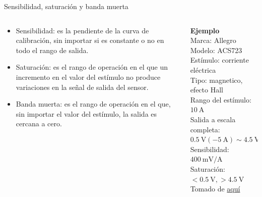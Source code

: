 \documentclass[aspectratio=169]{beamer}
\begin{document}
\begin{frame}{Sensibilidad, saturación y banda muerta}
    \begin{columns}[c, onlytextwidth]
        \begin{column}{0.60\textwidth}
            \begin{itemize}
                \item Sensibilidad: es la pendiente de la curva de calibración, sin importar si es constante o no en todo el rango de salida.  
                \item Saturación: es el rango de operación en el que un incremento en el valor del estímulo no produce variaciones en la señal de salida del sensor. 
                \item Banda muerta: es el rango de operación en el que, sin importar el valor del estímulo, la salida es cercana a cero.
            \end{itemize}
        \end{column}
        \begin{column}{0.35\textwidth}
            \textbf{Ejemplo}\\[4pt]
            Marca: Allegro\\[4pt]
            Modelo: ACS723\\[4pt]
            Estímulo: corriente eléctrica\\[4pt]
            Tipo: magnetico, efecto Hall\\[4pt]
            Rango del estímulo: $\SI{10}{\ampere}$\\[4pt]
            Salida a escala completa: $\SI{0.5}{\volt}(\SI{-5}{\ampere}) \sim \SI{4.5}{\volt}(\SI{5}{\ampere})$\\[4pt]
            Sensibilidad: $\SI{400}{\milli\volt/\ampere}$ \\[4pt]
            Saturación: $<\SI{0.5}{\volt}, >\SI{4.5}{\volt}$\\[10pt]
            \tiny{Tomado de \href{https://www.allegromicro.com/-/media/files/datasheets/acs723-datasheet.ashx}{aquí}}
        \end{column}
    \end{columns}
\end{frame}
\end{document}
